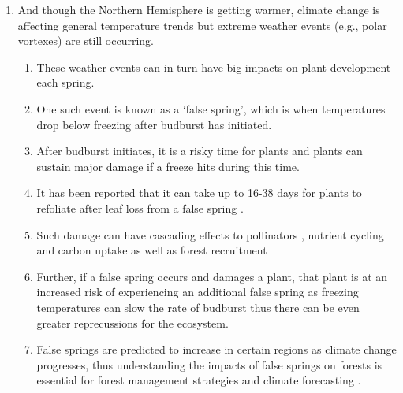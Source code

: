 \documentclass{article}\usepackage[]{graphicx}\usepackage[]{color}
\begin{document}
\begin{enumerate}
\item And though the Northern Hemisphere is getting warmer, climate change is affecting general temperature trends but extreme weather events (e.g., polar vortexes) are still occurring. 
  \begin{enumerate}
  \item These weather events can in turn have big impacts on plant development each spring. 
  \item One such event is known as a `false spring', which is when temperatures drop below freezing \citep[][i.e., below -2.2$^{\circ}$C]{Schwartz2002} after budburst has initiated.
  \item After budburst initiates, it is a risky time for plants \citep{Chamberlain2019} and plants can sustain major damage if a freeze hits during this time. 
  \item It has been reported that it can take up to 16-38 days for plants to refoliate after leaf loss from a false spring \citep{Augspurger2009, Augspurger2013, Gu2008, Menzel2015}. 
  \item Such damage can have cascading effects to pollinators \citep{Boggs2012, Pardee2017}, nutrient cycling and carbon uptake as well as forest recruitment \citep{Hufkens2012, Klosterman2018, Richardson2013}
  \item Further, if a false spring occurs and damages a plant, that plant is at an increased risk of experiencing an additional false spring as freezing temperatures can slow the rate of budburst \citep{Augspurger2009} thus there can be even greater reprecussions for the ecosystem.
  \item False springs are predicted to increase in certain regions as climate change progresses, thus understanding the impacts of false springs on forests is essential for forest management strategies and climate forecasting \citep{OBrien2019}.
  \end{enumerate}
  

\end{enumerate}
\end{document}
